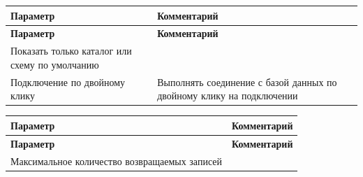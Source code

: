 

\begin{longtable}[r]{|>{\ttfamily}m{5cm}|m{10.5cm}|}
	\hline
	\centering\normalfont\bfseries Параметр &
	\centering\arraybslash\bfseries Комментарий\\\hline
	\endfirsthead
	\centering\normalfont\bfseries Параметр &
	\centering\arraybslash\bfseries Комментарий\\\hline
	\endhead
	Показать только каталог или схему по умолчанию & \\\hline
	Подключение по двойному клику & Выполнять соединение с базой данных по двойному клику на подключении \\\hline
\end{longtable}


\begin{longtable}[r]{|>{\ttfamily}m{5cm}|m{10.5cm}|}
	\hline
	\centering\normalfont\bfseries Параметр &
	\centering\arraybslash\bfseries Комментарий\\\hline
	\endfirsthead
	\centering\normalfont\bfseries Параметр &
	\centering\arraybslash\bfseries Комментарий\\\hline
	\endhead
	Максимальное количество возвращаемых записей  &  \\\hline
\end{longtable}


